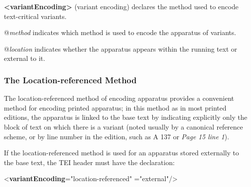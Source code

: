 \begin{sansreflist}
  
\item [\textbf{<variantEncoding>}] (variant encoding) declares the method used to encode text-critical variants.\hfil\\[-10pt]\begin{sansreflist}
    \item[@{\itshape method}]
  indicates which method is used to encode the apparatus of variants.
    \item[@{\itshape location}]
  indicates whether the apparatus appears within the running text or external to it.
\end{sansreflist}  
\end{sansreflist}

\subsubsection[{The Location-referenced Method}]{The Location-referenced Method}\label{TCAPLO}\par
The location-referenced method of encoding apparatus provides a convenient method for encoding printed apparatus; in this method as in most printed editions, the apparatus is linked to the base text by indicating explicitly only the block of text on which there is a variant (noted usually by a canonical reference scheme, or by line number in the edition, such as A 137 or \textit{Page 15 line 1}).\par
If the location-referenced method is used for an apparatus stored externally to the base text, the TEI header must have the declaration: \par\bgroup{}\exampleFont \begin{shaded}\noindent\mbox{}{<\textbf{variantEncoding}\hspace*{1em}{method}="{location-referenced}"\mbox{}\newline 
\hspace*{1em}{location}="{external}"/>}\end{shaded}\egroup\par \par

